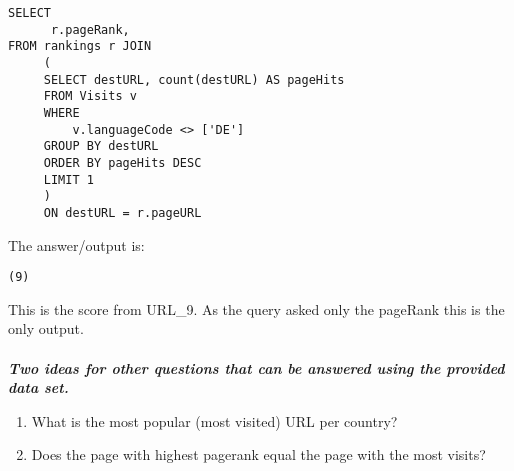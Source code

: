 \documentclass[11pt,a4paper,oneside]{article}
\begin{document}
\begin{verbatim}
SELECT
      r.pageRank,
FROM rankings r JOIN
     (
     SELECT destURL, count(destURL) AS pageHits
     FROM Visits v
     WHERE
         v.languageCode <> ['DE']
     GROUP BY destURL
     ORDER BY pageHits DESC
     LIMIT 1
     )
     ON destURL = r.pageURL
\end{verbatim}
\noindent
The answer/output is:

\begin{verbatim}
(9)
\end{verbatim}
This is the score from URL\_9. As the query asked only the pageRank this is the only output.
\\
\\
\noindent
\textbf{\textit{Two ideas for other questions that can be answered using the provided data set.}}

\begin{enumerate}
\item What is the most popular (most visited) URL per country?
\item Does the page with highest pagerank equal the page with the most visits?
\end{enumerate}


\printbibliography
\end{document}

